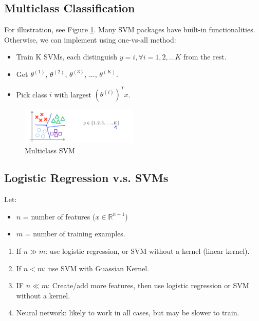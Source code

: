 \subsection{Multiclass Classification}
For illustration, see Figure \ref{fig:multi-class-svm}. Many SVM packages have built-in functionalities. Otherwise, we can implement using one-vs-all method:
\begin{itemize}
    \item Train K SVMs, each distinguish $y=i, \forall i = 1, 2, \dots K$ from the rest.
    \item Get $\theta^{(1)}$, $\theta^{(2)}$, $\theta^{(3)}$, $\dots$, $\theta^{(K)}$.
    \item Pick class $i$ with largest $(\theta^{(i)})^T x$.


\end{itemize}
\begin{figure}[htpb]
    \centering
    \includegraphics[width=0.5\textwidth]{image/multi-class-svm.png}
    \caption{Multiclass SVM}
    \label{fig:multi-class-svm}
\end{figure}


\subsection{Logistic Regression v.s. SVMs}
    Let:
    \begin{itemize}
        \item $n$ = number of features ($x \in \mathbb{R}^{n+1}$)
        \item $m$ = number of training examples.
    \end{itemize}

    \begin{enumerate}
        \item If $n \gg m$: use logistic regression, or SVM without a kernel (linear kernel).
        \item If $n < m$: use SVM with Guassian Kernel.
        \item IF $n \ll m$: Create/add more features, then use logistic regression or SVM without a kernel.
        \item  Neural network: likely to work in all cases, but may be slower to train.
    \end{enumerate}
    
